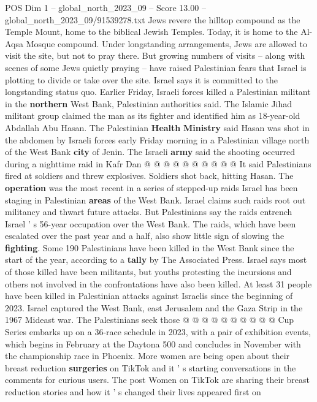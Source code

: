 \begin{textsample}{POS Dim 1 – global\_north\_2023\_09 – Score 13.00 – global\_north\_2023\_09/91539278.txt}
Jews revere the hilltop compound as the Temple Mount, home to the biblical Jewish Temples.
Today, it is home to the Al-Aqsa Mosque compound.
Under longstanding arrangements, Jews are allowed to visit the site, but not to pray there.
But growing numbers of visits -- along with scenes of some Jews quietly praying -- have raised Palestinian fears that Israel is plotting to divide or take over the site.
Israel says it is committed to the longstanding status quo.
Earlier Friday, Israeli forces killed a Palestinian militant in the \textbf{northern} West Bank, Palestinian authorities said.
The Islamic Jihad militant group claimed the man as its fighter and identified him as 18-year-old Abdallah Abu Hasan.
The Palestinian \textbf{Health} \textbf{Ministry} said Hasan was shot in the abdomen by Israeli forces early Friday morning in a Palestinian village north of the West Bank \textbf{city} of Jenin.
The Israeli \textbf{army} said the shooting occurred during a nighttime raid in Kafr Dan @ @ @ @ @ @ @ @ @ @ It said Palestinians fired at soldiers and threw explosives.
Soldiers shot back, hitting Hasan.
The \textbf{operation} was the most recent in a series of stepped-up raids Israel has been staging in Palestinian \textbf{areas} of the West Bank.
Israel claims such raids root out militancy and thwart future attacks.
But Palestinians say the raids entrench Israel ' s 56-year occupation over the West Bank.
The raids, which have been escalated over the past year and a half, also show little sign of slowing the \textbf{fighting}.
Some 190 Palestinians have been killed in the West Bank since the start of the year, according to a \textbf{tally} by The Associated Press.
Israel says most of those killed have been militants, but youths protesting the incursions and others not involved in the confrontations have also been killed.
At least 31 people have been killed in Palestinian attacks against Israelis since the beginning of 2023.
Israel captured the West Bank, east Jerusalem and the Gaza Strip in the 1967 Mideast war.
The Palestinians seek those @ @ @ @ @ @ @ @ @ @ Cup Series embarks up on a 36-race schedule in 2023, with a pair of exhibition events, which begins in February at the Daytona 500 and concludes in November with the championship race in Phoenix.
More women are being open about their breast reduction \textbf{surgeries} on TikTok and it ' s starting conversations in the comments for curious users.
The post Women on TikTok are sharing their breast reduction stories and how it ' s changed their lives appeared first on

\end{textsample}
